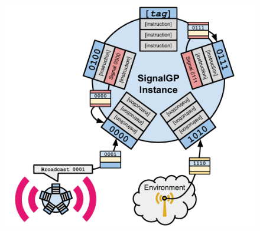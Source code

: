 


\begin{figure}
\begin{center}

\begin{minipage}{0.49\textwidth}
\centering
\includegraphics[width=\linewidth]{img/signalgp-cartoon}


\end{minipage}
\end{center}
\end{figure}
